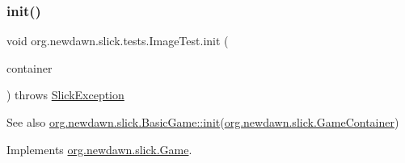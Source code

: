 \subsubsection{\texorpdfstring{init()}{init()}}
{\footnotesize\ttfamily void org.\+newdawn.\+slick.\+tests.\+Image\+Test.\+init (\begin{DoxyParamCaption}\item[{\mbox{\hyperlink{classorg_1_1newdawn_1_1slick_1_1_game_container}{Game\+Container}}}]{container }\end{DoxyParamCaption}) throws \mbox{\hyperlink{classorg_1_1newdawn_1_1slick_1_1_slick_exception}{Slick\+Exception}}\hspace{0.3cm}{\ttfamily [inline]}}

\begin{DoxySeeAlso}{See also}
\mbox{\hyperlink{classorg_1_1newdawn_1_1slick_1_1_basic_game_a8af0900217e4d389249f71367b22d114}{org.\+newdawn.\+slick.\+Basic\+Game\+::init}}(\mbox{\hyperlink{classorg_1_1newdawn_1_1slick_1_1_game_container}{org.\+newdawn.\+slick.\+Game\+Container}}) 
\end{DoxySeeAlso}


Implements \mbox{\hyperlink{interfaceorg_1_1newdawn_1_1slick_1_1_game_ad2dd6affab08bb8fdb5fab0815957b7a}{org.\+newdawn.\+slick.\+Game}}.


